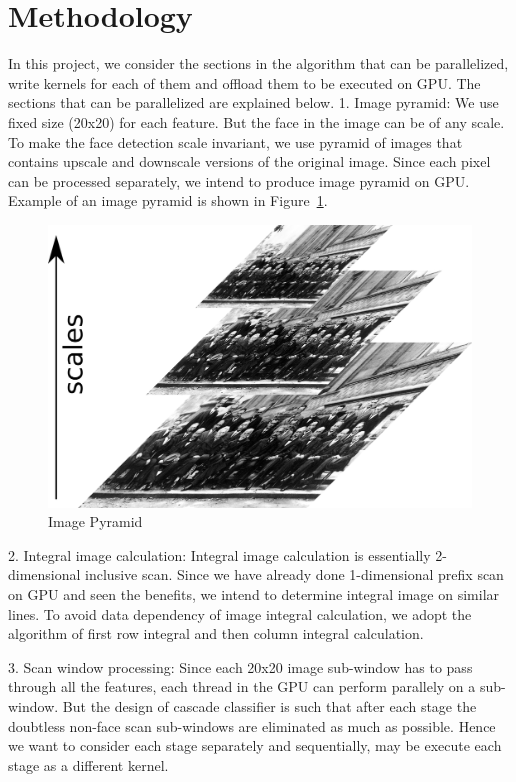\section{Methodology }\label{sec:meth}
In this project, we consider the sections in the algorithm that can be parallelized, 
write kernels for each of them and offload them to be executed on GPU. 
The sections that can be parallelized are explained below.
1. Image pyramid:
We use fixed size (20x20) for each feature. But the face in the image can be of any scale. 
To make the face detection scale  invariant, we use pyramid of images that contains upscale and
downscale versions of the original image. Since each pixel can be processed separately, 
we intend to produce image pyramid on GPU. Example of an image pyramid is shown in Figure~\ref{fig:scale}.

\begin{figure}[h]
  \includegraphics[width=0.45\linewidth]{figs/scale.jpg}
  \caption{Image Pyramid \textnormal{\small }  }
  \label{fig:scale}
\end{figure}

2. Integral image calculation:
Integral image calculation is essentially 2-dimensional inclusive scan. Since we have already done 
1-dimensional prefix scan on GPU and seen the benefits, we intend to determine integral image on 
similar lines.
To avoid data dependency of image integral calculation, we adopt the algorithm of first 
row integral and then column integral calculation.

3. Scan window processing:
Since each 20x20 image sub-window has to pass through all the features, each thread in the GPU 
can perform parallely on a sub-window. But the design of cascade classifier is such that after 
each stage the doubtless non-face scan sub-windows are eliminated as much as possible. Hence we 
want to consider each stage separately and sequentially, may be execute each stage as a different kernel.


